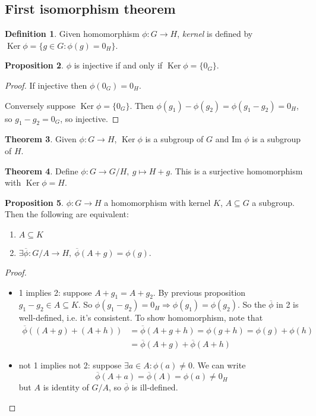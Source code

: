 \documentclass[a4paper]{article}
\newcommand{\Ker}{\operatorname{Ker}}
\theoremstyle{definition}
\newtheorem{defn}{Definition}[subsection]
\newtheorem{prop}[defn]{Proposition}
\newtheorem{thm}[defn]{Theorem}
\begin{document}
\subsection{First isomorphism theorem}
\begin{defn}
Given homomorphism $\phi:G\rightarrow H$, \textit{kernel} is defined by $\Ker \phi = \{g\in G:\phi(g)=0_H\}$.
\end{defn}
\begin{prop}
$\phi$ is injective if and only if $\Ker \phi = \{0_G\}$.
\end{prop}
\begin{proof}
If injective then $\phi (0_G)=0_H$.

Conversely suppose $\Ker \phi = \{0_G\}$. Then $\phi (g_1)-\phi (g_2) = \phi(g_1-g_2) = 0_H$, so $g_1-g_2=0_G$, so injective.
\end{proof}
\begin{thm}
Given $\phi:G\rightarrow H$, $\Ker \phi$ is a subgroup of $G$ and $\text{Im } \phi$ is a subgroup of $H.$
\end{thm}
\begin{thm}
Define $\phi : G\rightarrow G/H,\ g\mapsto H+g$. This is a surjective homomorphism with $\Ker \phi=H.$
\end{thm}
\begin{prop}
$\phi:G\rightarrow H$ a homomorphism with kernel $K$, $A\subseteq G$ a subgroup. Then the following are equivalent:
\begin{enumerate}
    \item $A\subseteq K$
    \item $\exists \overline{\phi}:G/A \rightarrow H,\ \overline{\phi} (A+g) = \phi (g).$
\end{enumerate}
\end{prop}
\begin{proof}
\begin{itemize}
    \item 1 implies 2: suppose $A+g_1=A+g_2$. By previous proposition $g_1-g_2 \in A \subseteq K$. So $\phi (g_1-g_2) = 0_H \Rightarrow \phi (g_1)=\phi(g_2).$ So the $\overline{\phi}$ in 2 is well-defined, i.e. it's consistent. To show homomorphism, note that
    \[
    \begin{aligned}
    \overline{\phi} ((A+g)+(A+h)) &= \overline{\phi} (A+g+h) = \phi (g+h) = \phi(g) + \phi(h) \\ &= \overline{\phi} (A+g)+\overline{\phi} (A+h)
    \end{aligned}
    \]
    \item not 1 implies not 2: suppose $\exists a \in A:\phi(a)\neq 0.$ We can write
    \[
    \overline{\phi} (A+a) = \overline{\phi} (A) = \phi(a) \neq 0_H
    \]
    but $A$ is identity of $G/A$, so $\overline{\phi}$ is ill-defined.
\end{itemize}
\end{proof}
\end{document}
